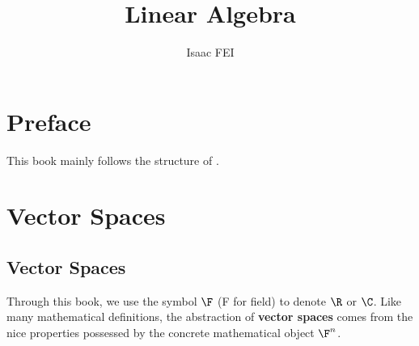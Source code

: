 \documentclass[thmcnt=section, color=cyan, 12pt]{my-elegantbook}
\title{Linear Algebra}
\author{Isaac FEI}
\begin{document}
\maketitle


\frontmatter
\chapter*{Preface}

This book mainly follows the structure of \cite{axlerLinearAlgebraDone1997}.


\tableofcontents
\mainmatter



\chapter{Vector Spaces}



\section{Vector Spaces}

Through this book, we use the symbol $\F$ (F for field) to denote $\R$ or $\C$.
Like many mathematical definitions,
the abstraction of \textbf{vector spaces}
comes from the nice properties possessed by the concrete mathematical object $\F^n$.
\end{document}
